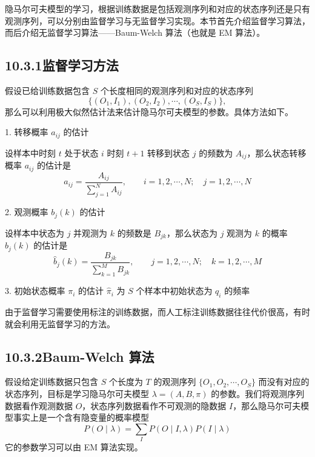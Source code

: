 \documentclass[UTF8, 12pt, fontset=fandol, oneside]{ctexart}
\begin{document}
隐马尔可夫模型的学习，根据训练数据是包括观测序列和对应的状态序列还是只有观测序列，可以分别由监督学习与无监督学习实现。本节首先介绍监督学习算法，而后介绍无监督学习算法——Baum-Welch 算法（也就是 EM 算法）。

\subsection*{10.3.1\quad 监督学习方法}

假设已给训练数据包含 $S$ 个长度相同的观测序列和对应的状态序列
\[
  \{(O_1,I_1),(O_2,I_2),\cdots,(O_S,I_S)\},
\]
那么可以利用极大似然估计法来估计隐马尔可夫模型的参数。具体方法如下。

1. 转移概率 $a_{ij}$ 的估计

设样本中时刻 $t$ 处于状态 $i$ 时刻 $t+1$ 转移到状态 $j$ 的频数为 $A_{ij}$，那么状态转移概率 $a_{ij}$ 的估计是
\begin{equation}
  \hat a_{ij}=\frac{A_{ij}}{\sum_{j=1}^N A_{ij}},\qquad i=1,2,\cdots,N;\quad j=1,2,\cdots,N
  \tag{10.30}
\end{equation}

2. 观测概率 $b_j(k)$ 的估计

设样本中状态为 $j$ 并观测为 $k$ 的频数是 $B_{jk}$，那么状态为 $j$ 观测为 $k$ 的概率 $b_j(k)$ 的估计是
\begin{equation}
  \hat b_j(k)=\frac{B_{jk}}{\sum_{k=1}^M B_{jk}},\qquad j=1,2,\cdots,N;\quad k=1,2,\cdots,M
  \tag{10.31}
\end{equation}

3. 初始状态概率 $\pi_i$ 的估计 $\hat\pi_i$ 为 $S$ 个样本中初始状态为 $q_i$ 的频率

由于监督学习需要使用标注的训练数据，而人工标注训练数据往往代价很高，有时就会利用无监督学习的方法。

\subsection*{10.3.2\quad Baum-Welch 算法}

假设给定训练数据只包含 $S$ 个长度为 $T$ 的观测序列 $\{O_1,O_2,\cdots,O_S\}$ 而没有对应的状态序列，目标是学习隐马尔可夫模型 $\lambda=(A,B,\pi)$ 的参数。我们将观测序列数据看作观测数据 $O$，状态序列数据看作不可观测的隐数据 $I$，那么隐马尔可夫模型事实上是一个含有隐变量的概率模型
\begin{equation}
  P(O\mid\lambda)=\sum_I P(O\mid I,\lambda)P(I\mid\lambda)
  \tag{10.32}
\end{equation}
它的参数学习可以由 EM 算法实现。
\end{document}
